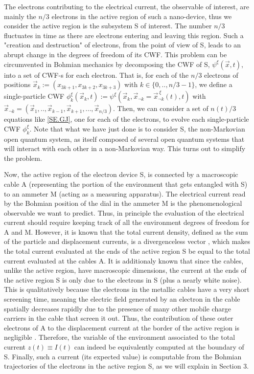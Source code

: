\documentclass[11pt, a4paper]{article} %
\begin{document}
The electrons contributing to the electrical current, the observable of interest, are mainly the $n/3$ electrons in the active region of such a nano-device, thus we consider the active region is the subsystem S of interest. The number $n/3$ fluctuates in time as there are electrons entering and leaving this region. Such a "creation and destruction" of electrons, from the point of view of S, leads to an abrupt change in the degrees of freedom of its CWF. This problem can be circumvented in Bohmian mechanics by decomposing the CWF of S, $\psi^{\xi}(\vec{x},t)$, into a set of CWF-s for each electron. That is, for each of the $n/3$ electrons of positions $\vec{x}_k:=(x_{3k+1}, x_{3k+2}, x_{3k+3})$ with $k\in\{0,..,n/3-1\}$, we define a single-particle CWF $\phi_k^\xi(\vec{x}_k, t):=\psi^{\xi}(\vec{x}_k, \vec{x}_{\neg k}=\vec{x}_{\neg k}^{\:\xi}(t),t)$ with $\vec{x}_{\neg k}=(\vec{x}_1,..,\vec{x}_{k-1}, \vec{x}_{k+1}, ...,\vec{x}_{n/3})$. Then, we can consider a set of $n(t)/3$ equations like \eqref{SE.GJ}, one for each of the electrons, to evolve each single-particle CWF $\phi_k^\xi$. Note that what we have just done is to consider S, the non-Markovian open quantum system, as itself composed of several open quantum systems that will interact with each other in a non-Markovian way. This turns out to simplify the problem.

Now, the active region of the electron device S, is connected by a macroscopic cable A (representing the portion of the environment that gets entangled with S) to an ammeter M (acting as a measuring apparatus). The electrical current read by the Bohmian position of the dial in the ammeter M is the phenomenological observable we want to predict. Thus, in principle the evaluation of the electrical current should require keeping track of all the environment degrees of freedom for A and M. However, it is known that the total current density, defined as the sum of the particle and displacement currents, is a divergenceless vector \cite{diver1, diver2}, which makes the total current evaluated at the ends of the active region S be equal to the total current evaluated at the cables A. It is additionaly known \cite{equiv} that since the cables, unlike the active region, have macroscopic dimensions, the current at the ends of the active region S is only due to the electrons in S (plus a nearly white noise). This is qualitatively because the electrons in the metallic cables have a very short screening time, meaning the electric field generated by an electron in the cable spatially decreases rapidly due to the presence of many other mobile charge carriers in the cable that screen it out. Thus, the contribution of these outer electrons of A to the displacement current at the border of the active region is negligible \cite{neg}. Therefore, the variable of the environment associated to the total current $z(t)\equiv I(t)$ can indeed be equivalently computed at the boundary of S. Finally, such a current (its expected value) is computable from the Bohmian trajectories of the electrons in the active region S, as we will explain in Section 3. 
\end{document}
